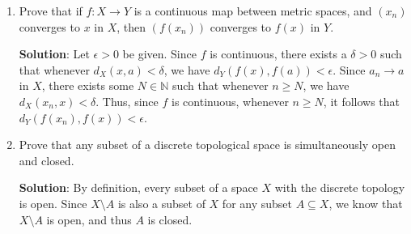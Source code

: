 \documentclass[letterpaper,12pt]{article}
\newcommand{\N}{\mathbb{N}}
\begin{document}
\begin{enumerate}
\item Prove that if $f:X\to Y$ is a continuous map between metric spaces, and $(x_n)$ converges to $x$ in $X$, then $(f(x_n))$ converges to $f(x)$ in $Y$.

\bigskip

{\bf Solution}: Let $\epsilon>0$ be given. Since $f$ is continuous, there exists a $\delta>0$ such that whenever $d_X(x,a)<\delta$, we have $d_Y(f(x),f(a))<\epsilon$. Since $a_n\to a$ in $X$, there exists some $N\in\N$ such that whenever $n\geq N$, we have $d_X(x_n,x)<\delta$. Thus, since $f$ is continuous, whenever $n\geq N$, it follows that $d_Y(f(x_n),f(x))<\epsilon$.

\item Prove that any subset of a discrete topological space is simultaneously open and closed.

\bigskip

{\bf Solution}: By definition, every subset of a space $X$ with the discrete topology is open. Since $X\setminus A$ is also a subset of $X$ for any subset $A\subseteq X$, we know that $X\setminus A$ is open, and thus $A$ is closed.

\end{enumerate}
\end{document}
